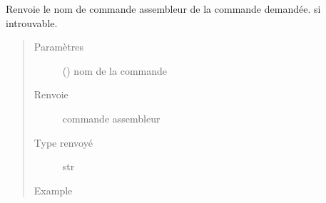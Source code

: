 \documentclass[letterpaper,10pt,french]{sphinxmanual}
\begin{document}
\begin{fulllineitems}

\begin{fulllineitems}
\label{\detokenize{processorengine:processorengine.ProcessorEngine.getAsmCommand}}
Renvoie le nom de commande assembleur de la commande demandée. \sphinxcode{\sphinxupquote{\textquotesingle{}\textquotesingle{}}} si introuvable.
\begin{quote}\begin{description}
\item[{Paramètres}] \leavevmode
{} () \textendash{} nom de la commande

\item[{Renvoie}] \leavevmode
commande assembleur

\item[{Type renvoyé}] \leavevmode
str

\item[{Example}] \leavevmode
\begin{sphinxVerbatim}[commandchars=\\\{\}]
\end{sphinxVerbatim}

\begin{sphinxVerbatim}[commandchars=\\\{\}]
\end{sphinxVerbatim}

\begin{sphinxVerbatim}[commandchars=\\\{\}]
\end{sphinxVerbatim}


\end{description}
\end{quote}
\end{fulllineitems}
\end{fulllineitems}
\end{document}
